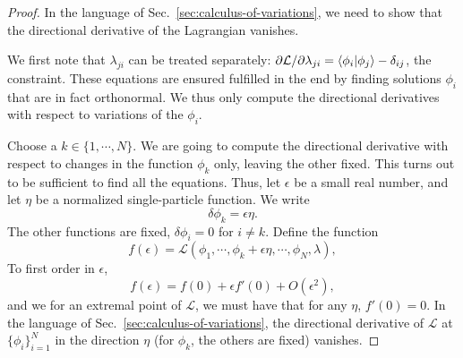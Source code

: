 \documentclass{report}
\theoremstyle{plain}
\theoremstyle{definition}
\begin{document}
\begin{proof}
  In the language of Sec.~\ref{sec:calculus-of-variations}, we need to
  show that the directional derivative of the Lagrangian
  vanishes.

  We first note that $\lambda_{ji}$ can be treated separately:
  $\partial \mathcal{L}/\partial \lambda_{ji} = \braket{\phi_i|\phi_j}
  - \delta_{ij}$, the constraint. These equations are ensured
  fulfilled in the end by finding solutions $\phi_i$ that are in fact
  orthonormal. We thus only compute the directional derivatives with
  respect to variations of the $\phi_i$.


  Choose a $k\in\{1,\cdots,N\}$.
  We are going to compute the directional derivative with respect to
  changes in the function $\phi_k$ only, leaving the other
  fixed. This turns out to be sufficient to find all the equations. Thus,
  let $\epsilon$ be a small real number, and let ${\eta}$ be a
  normalized single-particle function. We write
  \[ {\delta\phi_k} = \epsilon \eta. \]
  The other functions are fixed, $\delta \phi_i = 0$ for $i\neq k$.
  Define the function
  \begin{equation}
    f(\epsilon) = \mathcal{L}(\phi_1,\cdots,\phi_k +
    \epsilon\eta,\cdots,\phi_N, \lambda), 
  \end{equation}
  To first order in $\epsilon$,
  \begin{equation}
    f(\epsilon) = f(0) + \epsilon f'(0) + O(\epsilon^2),
  \end{equation}
  and we for an extremal point of $\mathcal{L}$, we must have that for
  any $\eta$, $f'(0)=0$.
  In the language of
  Sec.~\ref{sec:calculus-of-variations}, the directional derivative of
  $\mathcal{L}$ at $\{\phi_i\}_{i=1}^N$ in the direction
  $\eta$ (for $\phi_k$, the others are fixed) vanishes. 


\end{proof}
\end{document}
